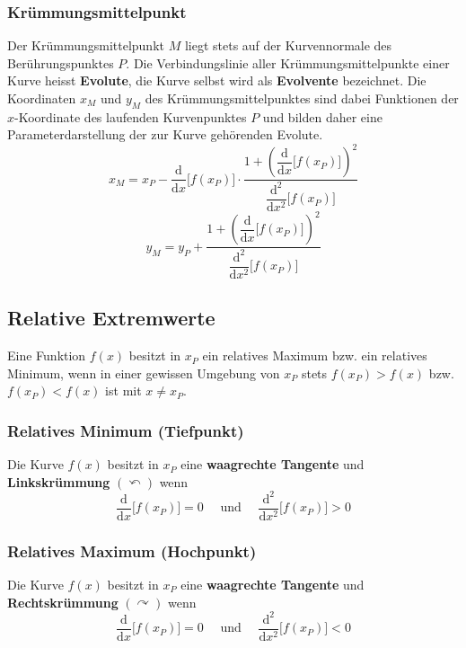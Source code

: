 \subsubsection{Krümmungsmittelpunkt}
Der Krümmungsmittelpunkt $M$ liegt stets auf der Kurvennormale des Berührungspunktes $P$. Die Verbindungslinie aller Krümmungsmittelpunkte einer Kurve heisst \textbf{Evolute}, die Kurve selbst wird als \textbf{Evolvente} bezeichnet. Die Koordinaten $x_M$ und $y_M$ des Krümmungsmittelpunktes sind dabei Funktionen der $x$-Koordinate des laufenden Kurvenpunktes $P$ und bilden daher eine Parameterdarstellung der zur Kurve gehörenden Evolute.
\begin{equation}
\boxed{x_M=x_P-\dfrac{\text{d}}{\text{d}x}\Big[f\left(x_P\right)\Big]\cdot \dfrac{1+\left(\dfrac{\text{d}}{\text{d}x}\Big[f\left(x_P\right)\Big]\right)^2}{\dfrac{\text{d}^2}{\text{d}x^2}\Big[f\left(x_P\right)\Big]}}
\end{equation}
\begin{equation}
\boxed{y_M=y_P+\dfrac{1+\left(\dfrac{\text{d}}{\text{d}x}\Big[f\left(x_P\right)\Big]\right)^2}{\dfrac{\text{d}^2}{\text{d}x^2}\Big[f\left(x_P\right)\Big]}}
\end{equation}
\subsection{Relative Extremwerte}
Eine Funktion $f\left(x\right)$ besitzt in $x_P$ ein relatives Maximum bzw. ein relatives Minimum, wenn in einer gewissen Umgebung von $x_P$ stets $f\left(x_P\right)>f\left(x\right)$ bzw. $f\left(x_P\right)<f\left(x\right)$ ist mit $x\neq x_P$.
\subsubsection{Relatives Minimum (Tiefpunkt)}
Die Kurve $f\left(x\right)$ besitzt in $x_P$ eine \textbf{waagrechte Tangente} und \textbf{Linkskrümmung} $\left(\curvearrowleft\right)$ wenn
\begin{equation} 
\boxed{\dfrac{\text{d}}{\text{d}x}\Big[f\left(x_P\right)\Big]=0\quad \text{ und } \quad \dfrac{\text{d}^2}{\text{d}x^2}\Big[f\left(x_P\right)\Big]>0}
\end{equation} 
\subsubsection{Relatives Maximum (Hochpunkt)}
Die Kurve $f\left(x\right)$ besitzt in $x_P$ eine \textbf{waagrechte Tangente} und \textbf{Rechtskrümmung} $\left(\curvearrowright\right)$ wenn
\begin{equation} 
\boxed{\dfrac{\text{d}}{\text{d}x}\Big[f\left(x_P\right)\Big]=0\quad \text{ und } \quad \dfrac{\text{d}^2}{\text{d}x^2}\Big[f\left(x_P\right)\Big]<0}
\end{equation}
